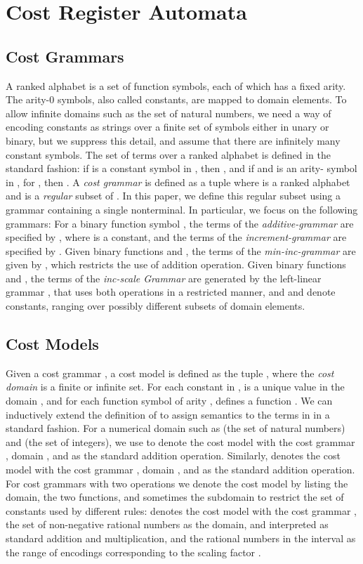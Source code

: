 \documentclass[11pt]{article}
\newcommand{\mypar}[1]{\subsection{#1}}
\begin{document}
\section{Cost Register Automata}\label{sec:cra}
\mypar{Cost Grammars}
A ranked alphabet  is a set of function symbols, each of which
has a fixed arity.  The arity-0 symbols, also called constants, are
mapped to domain elements.  To allow infinite domains such as the set
 of natural numbers, we need a way of encoding constants as
strings over a finite set of symbols either in unary or binary, but we
suppress this detail, and assume that there are infinitely many
constant symbols.  The set  of terms over a ranked
alphabet is defined in the standard fashion: if  is a constant
symbol in , then , and if
 and  is an arity- symbol
in , for , then .
A {\em cost grammar}  is defined as a tuple 
where  is a ranked alphabet and  is a {\em regular}
subset of . In this paper, we define this regular
subset using a grammar containing a single nonterminal.  In
particular, we focus on the following grammars: For a binary function
symbol , the terms of the {\it additive-grammar } are
specified by , where  is a constant, and the
terms of the {\it increment-grammar } are specified by .  Given binary functions  and , the terms of
the {\em min-inc-grammar \/} are given by , which restricts the use of addition
operation.  Given binary functions  and , the terms of the {\it
inc-scale Grammar } are generated by the left-linear
grammar , that uses both operations in
a restricted manner, and  and  denote constants, ranging over
possibly different subsets of domain elements.

\mypar{Cost Models}
Given a cost grammar , a cost model
 is defined as the tuple ,
where the {\em cost domain\/}  is a finite or infinite set.
For each constant  in ,  is a unique value in
the domain , and for each function symbol  of arity ,
 defines a function .
We can inductively extend the definition of  to assign
semantics to the terms in  in a standard fashion.  For a
numerical domain  such as  (the set of natural numbers)
and  (the set of integers), we use 
to denote the cost model with the cost grammar , domain
, and  as the standard addition operation.
Similarly,  denotes the cost model with the cost
grammar , domain , and  as the standard
addition operation.  For cost grammars with two operations we denote
the cost model by listing the domain, the two functions, and sometimes
the subdomain to restrict the set of constants used by different
rules:  denotes the cost model with
the cost grammar , the set  of
non-negative rational numbers as the domain,  and  interpreted
as standard addition and multiplication, and the rational numbers in
the interval  as the range of encodings corresponding to the
scaling factor .
\end{document}
